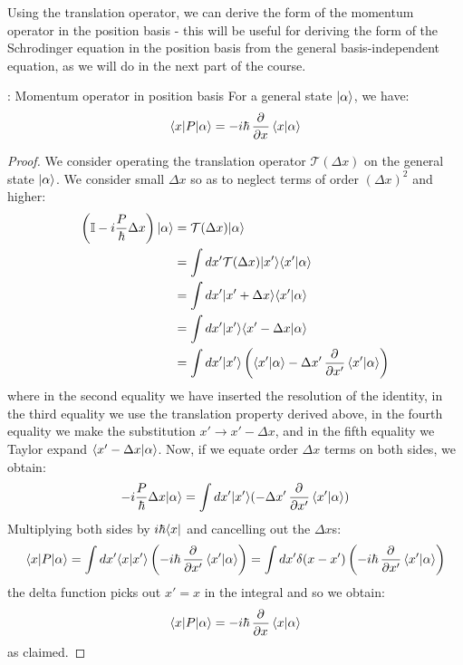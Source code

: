 Using the translation operator, we can derive the form of the momentum operator in the position basis - this will be useful for deriving the form of the Schrodinger equation in the position basis from the general basis-independent equation, as we will do in the next part of the course.

\begin{propbox}{: Momentum operator in position basis}
    For a general state $\lvert \alpha \rangle$, we have:
    \begin{equation}
        \bra{x}P\ket{\alpha} = -i\hbar\dpd{}{x}\braket{x}{\alpha}
    \end{equation}
\end{propbox}

\begin{proof}
We consider operating the translation operator $\mathcal{T}(\Delta x)$ on the general state $\lvert \alpha \rangle$. We consider small $\Delta x$ so as to neglect terms of order $(\Delta x)^2$ and higher:
\begin{equation}
    \begin{split}
        \left(\mathbb{I} - i\frac{P}{\hbar}\Delta x\right)\ket{\alpha} &= \mathcal{T}(\Delta x)\ket{\alpha} 
        \\ &= \int dx' \mathcal{T}(\Delta x)\ket{x'}\braket{x'}{\alpha}
        \\ &= \int dx' \ket{x' + \Delta x} \braket{x'}{\alpha}
        \\ &= \int dx' \ket{x'}\braket{x' - \Delta x}{\alpha} 
        \\ &= \int dx' \ket{x'}\left(\braket{x'}{\alpha} - \Delta x'\dpd{}{x'}\braket{x'}{\alpha}\right)
    \end{split}
\end{equation}
where in the second equality we have inserted the resolution of the identity, in the third equality we use the translation property derived above, in the fourth equality we make the substitution $x' \to x' - \Delta x$, and in the fifth equality we Taylor expand $\langle x' - \Delta x \lvert \alpha \rangle$. Now, if we equate order $\Delta x$ terms on both sides, we obtain:
\begin{equation}
    -i\frac{P}{\hbar}\Delta x\ket{\alpha} = \int dx' \ket{x'}(-\Delta x'\dpd{}{x'}\braket{x'}{\alpha})
\end{equation}
Multiplying both sides by $i\hbar\langle x \rvert$ and cancelling out the $\Delta x$s:
\begin{equation}
    \bra{x}P\ket{\alpha} = \int dx' \braket{x}{x'}\left(-i\hbar \dpd{}{x'}\braket{x'}{\alpha}\right) = \int dx' \delta(x - x')\left(-i\hbar \dpd{}{x'}\braket{x'}{\alpha}\right)
\end{equation}
the delta function picks out $x' = x$ in the integral and so we obtain:
\begin{equation}\label{eq-momentumXbasis}
    \bra{x}P\ket{\alpha} = -i\hbar\dpd{}{x}\braket{x}{\alpha}
\end{equation}
as claimed.
\end{proof}

